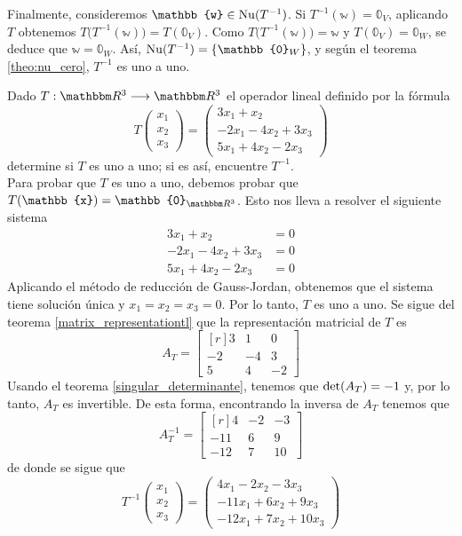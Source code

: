 \begin{theorem}
    Finalmente, consideremos $\mathbb{w} \in \Nuc(T^{-1})$. Si $T^{-1}(\mathbb{w}) = \mathbb{0}_V$, aplicando $T$ obtenemos $T\big(T^{-1}(\mathbb{w})\big) = T(\mathbb{0}_V)$. Como $T\big(T^{-1}(\mathbb{w})\big) = \mathbb{w}$ y $T(\mathbb{0}_V) = \mathbb{0}_W$, se deduce que $\mathbb{w} = \mathbb{0}_W$. Así, $\Nuc(T^{-1}) = \{\mathbb{0}_W\}$, y según el teorema \ref{theo:nu_cero}, $T^{-1}$ es uno a uno.
\end{theorem}

\begin{example}
    Dado $T: \RR[3] \longrightarrow \RR[3]$ el operador lineal definido por la fórmula
    $$T\begin{pmatrix} x_1 \\ x_2 \\ x_3 \end{pmatrix} = \begin{pmatrix} 3x_1 + x_2 \\ -2x_1 - 4x_2 + 3x_3 \\ 5x_1 + 4x_2 - 2x_3 \end{pmatrix}$$
    determine si $T$ es uno a uno; si es así, encuentre $T^{-1}$. \\
    \solucion Para probar que $T$ es uno a uno, debemos probar que $T(\mathbb{x}) = \mathbb{0}_{\RR[3]}$. Esto nos lleva a resolver el siguiente sistema
    \begin{align*}
        3x_1 + x_2 & = 0 \\
        -2x_1 - 4x_2 + 3x_3 & = 0 \\
        5x_1 + 4x_2 - 2x_3 & = 0
    \end{align*}
    Aplicando el método de reducción de Gauss-Jordan, obtenemos que el sistema tiene solución única y $x_1 = x_2 = x_3 = 0$. Por lo tanto, $T$ es uno a uno. Se sigue del teorema \ref{matrix_representationtl} que la representación matricial de $T$ es
    $$A_T = \begin{bmatrix*}[r]
        3 & 1 & 0 \\
        -2 & -4 & 3 \\
        5 & 4 & -2
    \end{bmatrix*}$$
    Usando el teorema \ref{singular_determinante}, tenemos que $\operatorname{det}(A_T) = -1$ y, por lo tanto, $A_T$ es invertible. De esta forma, encontrando la inversa de $A_T$ tenemos que
    $$A^{-1}_T = \begin{bmatrix*}[r]
        4 & -2 & -3 \\
        -11 & 6 & 9 \\
        -12 & 7 & 10
    \end{bmatrix*}$$\newpage\noindent
    de donde se sigue que
    $$T^{-1}\begin{pmatrix} x_1 \\ x_2 \\ x_3 \end{pmatrix} = \begin{pmatrix} 4x_1 - 2x_2 - 3x_3 \\ -11x_1 + 6x_2 + 9x_3 \\ -12x_1 + 7x_2 + 10x_3 \end{pmatrix}$$
\end{example}

